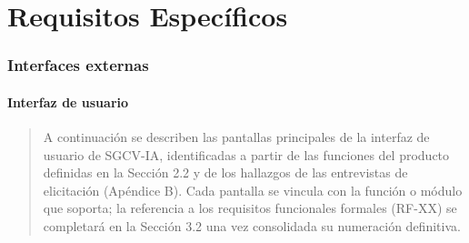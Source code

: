 \documentclass[
]{article}
\begin{document}
\section{Requisitos Específicos}\label{requisitos-especuxedficos}

\subsubsection{Interfaces externas}\label{interfaces-externas}

\paragraph{Interfaz de usuario}\label{interfaz-de-usuario}

\begin{quote}
A continuación se describen las pantallas principales de la interfaz de
usuario de SGCV-IA, identificadas a partir de las funciones del producto
definidas en la Sección 2.2 y de los hallazgos de las entrevistas de
elicitación (Apéndice B). Cada pantalla se vincula con la función o
módulo que soporta; la referencia a los requisitos funcionales formales
(RF-XX) se completará en la Sección 3.2 una vez consolidada su
numeración definitiva.
\end{quote}
\end{document}
